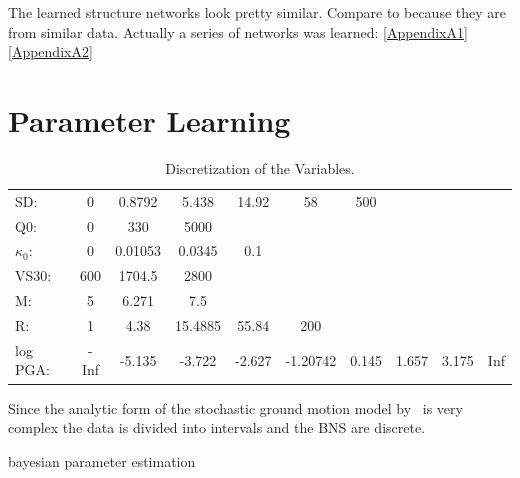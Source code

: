 The learned structure networks look pretty similar. Compare to \citep{Vogel2014} because they are from similar data. Actually a series of networks was learned: \ref{AppendixA1} \ref{AppendixA2}


\section{Parameter Learning}
\begin{table}[h]
\begin{tabular}{l|c c c c c c c c c  }
\hline
SD:&         0&  0.8792&   5.438&  14.92&       58&   500&      &      & \\
Q0:&         0&     330&    5000&       &         &      &      &      & \\
$\kappa_0$:& 0& 0.01053&  0.0345&    0.1&         &      &      &      & \\
VS30:&     600&  1704.5&    2800&       &         &      &      &      & \\
M:&          5&   6.271&     7.5&       &         &      &      &      & \\
R:&          1&    4.38& 15.4885&  55.84&      200&      &      &      & \\
log PGA:& -Inf&  -5.135&  -3.722& -2.627& -1.20742& 0.145& 1.657& 3.175& Inf\\
\end{tabular}
\caption[Discretization of the Variables]{Discretization of the Variables.}
\label{tab:2}
\end{table}


Since the analytic form of the stochastic ground motion model by~\cite{boore2003} is very complex the data is divided into intervals and the BNS are discrete.


bayesian parameter estimation

